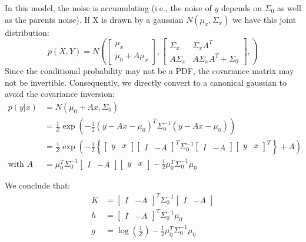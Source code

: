 \documentclass[11pt]{article}
\begin{document}
In this model, the noise is accumulating (i.e., the noise of $y$ depends on $\Sigma_0$ as well as the parents noise). If X is drawn by a gaussian $N(\mu_x, \Sigma_x)$ we have this joint distribution:
$$
p(X,Y) = N \left(
  \left[ \begin{array}{c} \mu_x \\ \mu_0 + A \mu_x \end{array}\right],
  \left[ \begin{array}{cc} \Sigma_x & \Sigma_x A^T \\ A\Sigma_x & A\Sigma_xA^T + \Sigma_0 \end{array}\right],
\right)
$$
Since the conditional probability may not be a PDF, the covariance matrix may not be invertible. Consequently, we directly convert to a canonical gaussian to avoid the covariance inversion:
\begin{align*}
p(y|x)&=N(\mu_0 + Ax, \Sigma_0)  \\
&= \frac{1}{Z}\exp\left(
   -\frac{1}{2}(y-Ax-\mu_0)^T\Sigma_0^{-1}(y-Ax-\mu_0)
   \right)\\
&= \frac{1}{Z}\exp\left(
-\frac{1}{2}
  \left\{
  \left[ \begin{array}{cc} y & x \end{array}\right]
  \left[ \begin{array}{cc} I & -A \end{array}\right]^T
  \Sigma_0^{-1}
  \left[ \begin{array}{cc} I & -A \end{array}\right]
  \left[ \begin{array}{cc} y & x \end{array}\right]^T
  \right\} +A
\right) \\
\text{with~}A &= \mu_0^T\Sigma_0^{-1} \left[ \begin{array}{cc} I & -A \end{array}\right]
                                      \left[ \begin{array}{cc} y & x \end{array}\right]
                 -\frac{1}{2}\mu_0^T \Sigma_0^{-1} \mu_0
\end{align*}

We conclude that:
\begin{align}
K& = \left[ \begin{array}{cc} I & -A \end{array}\right]^T
     \Sigma_0^{-1}
     \left[ \begin{array}{cc} I & -A \end{array}\right] \\
h &= \left[ \begin{array}{cc} I & -A \end{array}\right]^T \Sigma_0^{-1} \mu_0 \\
g &=  \log(\frac{1}{Z})-\frac{1}{2}\mu_0^T \Sigma_0^{-1} \mu_0
\end{align}
\end{document}

